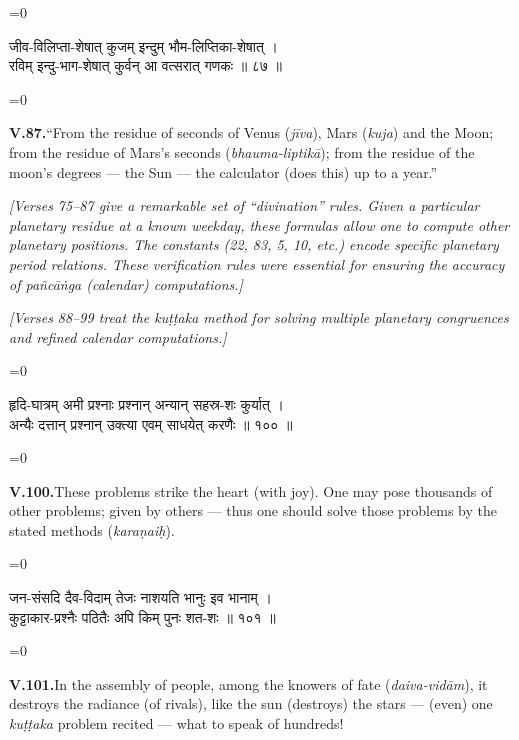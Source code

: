 \documentclass[11pt,a4paper]{article}
\newcommand{\cnote}[1]{\textcolor{notecolor}{\textit{#1}}}
\newcommand{\dev}[1]{{\devanagarifont\color{sktcolor}#1}}
\newcommand{\iast}[1]{\textit{#1}}
\newenvironment{paracol}[1]{\begingroup}{\endgroup}
\newcommand{\switchcolumn}[1][]{%
  \ifnum#1=0\relax\else\par\nobreak\vspace{0.5em}\par\nobreak\fi%
}
\begin{document}
\vspace{0.3cm}

\begin{paracol}{2}
\switchcolumn[0]
\dev{%
जीव-विलिप्ता-शेषात् कुजम् इन्दुम् भौम-लिप्तिका-शेषात् ।\\
रविम् इन्दु-भाग-शेषात् कुर्वन् आ वत्सरात् गणकः ॥ ८७ ॥
}

\switchcolumn[1]
\textbf{V.87.}\quad ``From the residue of seconds of Venus
(\iast{jīva}), Mars (\iast{kuja}) and the Moon; from the residue
of Mars's seconds (\iast{bhauma-liptikā}); from the residue of
the moon's degrees — the Sun — the calculator (does this) up to
a year.''
\end{paracol}

\vspace{0.5cm}
\cnote{[Verses 75–87 give a remarkable set of ``divination'' rules.
Given a particular planetary residue at a known weekday, these
formulas allow one to compute other planetary positions. The
constants (22, 83, 5, 10, etc.) encode specific planetary period
relations. These verification rules were essential for ensuring
the accuracy of \iast{pañcāṅga} (calendar) computations.]}

\newpage

\cnote{[Verses 88–99 treat the \iast{kuṭṭaka} method for solving
multiple planetary congruences and refined calendar computations.]}
\vspace{0.5cm}

\begin{paracol}{2}
\switchcolumn[0]
\dev{%
हृदि-घात्रम् अमी प्रश्नाः प्रश्नान् अन्यान् सहस्र-शः कुर्यात् ।\\
अन्यैः दत्तान् प्रश्नान् उक्त्या एवम् साधयेत् करणैः ॥ १०० ॥
}

\switchcolumn[1]
\textbf{V.100.}\quad These problems strike the heart (with joy).
One may pose thousands of other problems; given by others — thus
one should solve those problems by the stated methods
(\iast{karaṇaiḥ}).
\end{paracol}

\vspace{0.3cm}

\begin{paracol}{2}
\switchcolumn[0]
\dev{%
जन-संसदि दैव-विदाम् तेजः नाशयति भानुः इव भानाम् ।\\
कुट्टाकार-प्रश्नैः पठितैः अपि किम् पुनः शत-शः ॥ १०१ ॥
}

\switchcolumn[1]
\textbf{V.101.}\quad In the assembly of people, among the knowers
of fate (\iast{daiva-vidām}), it destroys the radiance (of rivals),
like the sun (destroys) the stars — (even) one \iast{kuṭṭaka}
problem recited — what to speak of hundreds!
\end{paracol}
\end{document}
